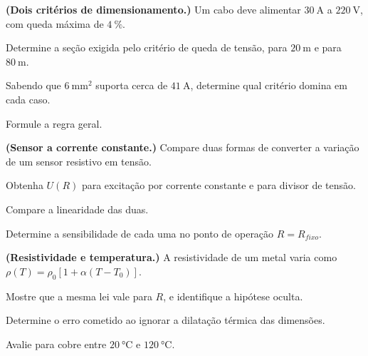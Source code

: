 \begin{questao}[4]{}

\textbf{(Dois critérios de dimensionamento.)} Um cabo deve alimentar
$\SI{30}{\ampere}$ a $\SI{220}{\volt}$, com queda máxima de
$\SI{4}{\percent}$.
\begin{itensq}
\item Determine a seção exigida pelo critério de queda de tensão, para
      $\SI{20}{\meter}$ e para $\SI{80}{\meter}$.
\item Sabendo que $\SI{6}{\milli\meter\squared}$ suporta cerca de
      $\SI{41}{\ampere}$, determine qual critério domina em cada caso.
\item Formule a regra geral.
\end{itensq}


\end{questao}
\begin{questao}[4]{}

\textbf{(Sensor a corrente constante.)} Compare duas formas de converter a
variação de um sensor resistivo em tensão.
\begin{itensq}
\item Obtenha $U(R)$ para excitação por corrente constante e para divisor de
      tensão.
\item Compare a linearidade das duas.
\item Determine a sensibilidade de cada uma no ponto de operação
      $R=R_{fixo}$.
\end{itensq}


\end{questao}
\begin{questao}[4]{}

\textbf{(Resistividade e temperatura.)} A resistividade de um metal varia como
$\rho(T)=\rho_0\left[1+\alpha(T-T_0)\right]$.
\begin{itensq}
\item Mostre que a mesma lei vale para $R$, e identifique a hipótese oculta.
\item Determine o erro cometido ao ignorar a dilatação térmica das dimensões.
\item Avalie para cobre entre $\SI{20}{\celsius}$ e
      $\SI{120}{\celsius}$.
\end{itensq}


\end{questao}
